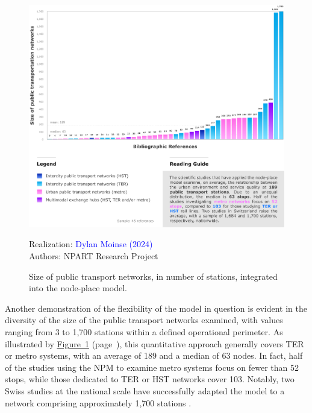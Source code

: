\begin{refsegment}
    \begin{figure}[h!]\vspace*{4pt}
        \caption{Size of public transport networks, in number of stations, integrated into the node-place model.}
        \label{fig-chap6:taille-reseaux-TC}
        \centerline{\includegraphics[width=1\columnwidth]{src/Figures/Chap-6/EN_NPART_Taille_reseaux_TC.pdf}}
        \vspace{5pt}
        \begin{flushright}\scriptsize{
        Realization: \textcolor{blue}{Dylan Moinse (2024)}
        \\
        Authors: \acrshort{NPART} Research Project
        }\end{flushright}
    \end{figure}

Another demonstration of the flexibility of the model in question is evident in the diversity of the size of the public transport networks examined, with values ranging from 3 to 1,700 stations within a defined operational perimeter. As illustrated by \hyperref[fig-chap6:taille-reseaux-TC]{Figure~\ref{fig-chap6:taille-reseaux-TC}} (page~\pageref{fig-chap6:taille-reseaux-TC}), this quantitative approach generally covers \acrfull{TER} or metro systems, with an average of 189 and a median of 63 nodes. In fact, half of the studies using the \acrshort{NPM} to examine metro systems focus on fewer than 52 stops, while those dedicated to \acrshort{TER} or \acrshort{HST} networks cover 103. Notably, two Swiss studies at the national scale have successfully adapted the model to a network comprising approximately 1,700 stations \textcolor{blue}{\autocites[194]{reusser_classifying_2008}[672]{zemp_classifying_2011}}.%


\end{refsegment}
